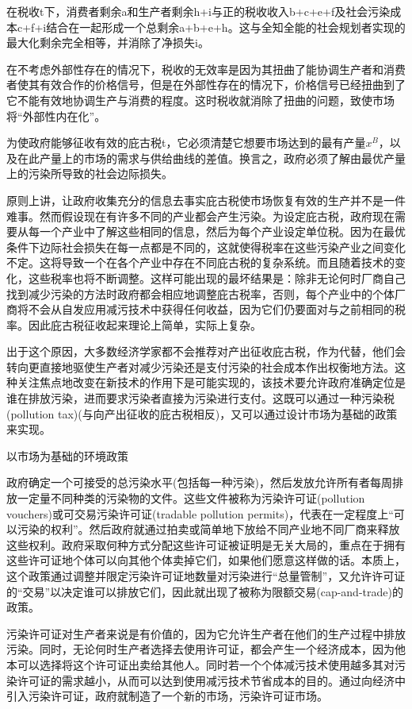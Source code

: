 \documentclass{article}
\begin{document}
在税收t下，消费者剩余a和生产者剩余h+i与正的税收收入b+c+e+f及社会污染成本c+f+i结合在一起形成一个总剩余a+b+e+h。这与全知全能的社会规划者实现的最大化剩余完全相等，并消除了净损失i。

在不考虑外部性存在的情况下，税收的无效率是因为其扭曲了能协调生产者和消费者使其有效合作的价格信号，但是在外部性存在的情况下，价格信号已经扭曲到了它不能有效地协调生产与消费的程度。这时税收就消除了扭曲的问题，致使市场将“外部性内在化”。

为使政府能够征收有效的庇古税t，它必须清楚它想要市场达到的最有产量$ x^B $，以及在此产量上的市场的需求与供给曲线的差值。换言之，政府必须了解由最优产量上的污染所导致的社会边际损失。

原则上讲，让政府收集充分的信息去事实庇古税使市场恢复有效的生产并不是一件难事。然而假设现在有许多不同的产业都会产生污染。为设定庇古税，政府现在需要从每一个产业中了解这些相同的信息，然后为每个产业设定单位税。因为在最优条件下边际社会损失在每一点都是不同的，这就使得税率在这些污染产业之间变化不定。这将导致一个在各个产业中存在不同庇古税的复杂系统。而且随着技术的变化，这些税率也将不断调整。这样可能出现的最坏结果是：除非无论何时厂商自己找到减少污染的方法时政府都会相应地调整庇古税率，否则，每个产业中的个体厂商将不会从自发应用减污技术中获得任何收益，因为它们仍要面对与之前相同的税率。因此庇古税征收起来理论上简单，实际上复杂。

出于这个原因，大多数经济学家都不会推荐对产出征收庇古税，作为代替，他们会转向更直接地驱使生产者对减少污染还是支付污染的社会成本作出权衡地方法。这种关注焦点地改变在新技术的作用下是可能实现的，该技术要允许政府准确定位是谁在排放污染，进而要求污染者直接为污染进行支付。这既可以通过一种污染税(pollution tax)(与向产出征收的庇古税相反)，又可以通过设计市场为基础的政策来实现。

\hspace*{\fill}

以市场为基础的环境政策

政府确定一个可接受的总污染水平(包括每一种污染)，然后发放允许所有者每周排放一定量不同种类的污染物的文件。这些文件被称为污染许可证(pollution vouchers)或可交易污染许可证(tradable pollution permits)，代表在一定程度上“可以污染的权利”。然后政府就通过拍卖或简单地下放给不同产业地不同厂商来释放这些权利。政府采取何种方式分配这些许可证被证明是无关大局的，重点在于拥有这些许可证地个体可以向其他个体卖掉它们，如果他们愿意这样做的话。本质上，这个政策通过调整并限定污染许可证地数量对污染进行“总量管制”，又允许许可证的“交易”以决定谁可以排放它们，因此就出现了被称为限额交易(cap-and-trade)的政策。

污染许可证对生产者来说是有价值的，因为它允许生产者在他们的生产过程中排放污染。同时，无论何时生产者选择去使用许可证，都会产生一个经济成本，因为他本可以选择将这个许可证出卖给其他人。同时若一个个体减污技术使用越多其对污染许可证的需求越小，从而可以达到使用减污技术节省成本的目的。通过向经济中引入污染许可证，政府就制造了一个新的市场，污染许可证市场。
\end{document}
